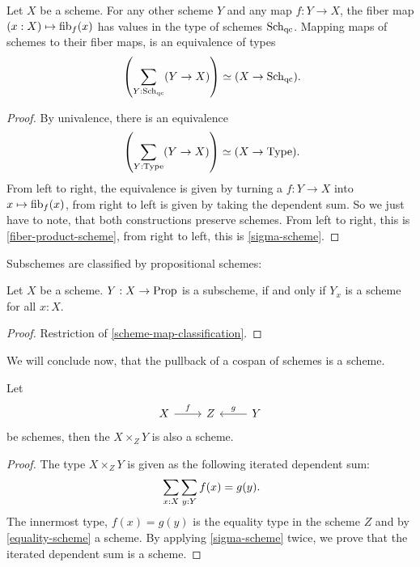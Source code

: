 \begin{corollary}
  \label{scheme-map-classification}
  Let $X$ be a scheme.
  For any other scheme $Y$ and any map $f:Y\to X$,
  the fiber map
  $(x:X)\mapsto \mathrm{fib}_f(x)$
  has values in the type of schemes $\operatorname{\mathrm{Sch}_{qc}}$.
  Mapping maps of schemes to their fiber maps,
  is an equivalence of types
  \[ \left(\sum_{Y:\Sch}(Y\to X)\right)\simeq (X\to \Sch)\rlap{.}\]
\end{corollary}

\begin{proof}
  By univalence, there is an equivalence
  \[ \left(\sum_{Y:\Type}(Y\to X)\right)\simeq (X\to \Type)\rlap{.} \]
  From left to right, the equivalence is given by turning a $f:Y\to X$ into $x\mapsto \mathrm{fib}_f(x)$,
  from right to left is given by taking the dependent sum.
  So we just have to note, that both constructions preserve schemes.
  From left to right, this is \cref{fiber-product-scheme}, from right to left,
  this is \cref{sigma-scheme}.
\end{proof}

Subschemes are classified by propositional schemes:

\begin{corollary}
  Let $X$ be a scheme.
  $Y:X\to\mathrm{Prop}$ is a subscheme,
  if and only if $Y_x$ is a scheme for all $x:X$.
\end{corollary}

\begin{proof}
  Restriction of \cref{scheme-map-classification}.
\end{proof}

We will conclude now,
that the pullback of a cospan of schemes is a scheme.

\begin{theorem}%
  \label{fiber-product-scheme}
  Let
  \[
    \begin{tikzcd}
      X\ar[r,"f"] & Z & Y\ar[l,swap,"g"]
    \end{tikzcd}
  \]
  be schemes, then the  $X\times_Z Y$ is also a scheme.
\end{theorem}

\begin{proof}
  The type $X\times_Z Y$ is given as the following iterated dependent sum:
  \[ \sum_{x:X}\sum_{y:Y}f(x)=g(y)\rlap{.}\]
  The innermost type, $f(x)=g(y)$
  is the equality type in the scheme $Z$ and by \cref{equality-scheme} a scheme.
  By applying \cref{sigma-scheme} twice, we prove that the iterated dependent sum is a scheme.
\end{proof}
